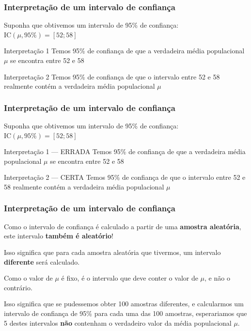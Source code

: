 \documentclass[11pt]{beamer}
\begin{document}
\begin{frame}
\frametitle{Interpretação de um intervalo de confiança}

Suponha que obtivemos um intervalo de 95\% de confiança:
\(\text{IC}(\mu,95\%) = [52; 58]\)

\begin{block}{Interpretação 1}
Temos 95\% de confiança de que a verdadeira média populacional $\mu$
se encontra entre 52 e 58
\end{block}
\begin{block}{Interpretação 2}
Temos 95\% de confiança de que o intervalo entre 52 e 58 realmente
contém a verdadeira média populacional $\mu$
\end{block}
\end{frame}

\begin{frame}
\frametitle{Interpretação de um intervalo de confiança}

Suponha que obtivemos um intervalo de 95\% de confiança:
\(\text{IC}(\mu,95\%) = [52; 58]\)

\begin{alertblock}{Interpretação 1 --- ERRADA}
Temos 95\% de confiança de que a verdadeira média populacional $\mu$
se encontra entre 52 e 58
\end{alertblock}
\begin{block}{Interpretação 2 --- CERTA}
Temos 95\% de confiança de que o intervalo entre 52 e 58 realmente
contém a verdadeira média populacional $\mu$
\end{block}
\end{frame}

\begin{frame}
\frametitle{Interpretação de um intervalo de confiança}

Como o intervalo de confiança é calculado a partir de uma
\textbf{amostra aleatória}, este intervalo \textbf{também é aleatório}!

Isso significa que para cada amostra aleatória que tivermos, um
intervalo \textbf{diferente} será calculado.

Como o valor de \(\mu\) é fixo, é o intervalo que deve conter o valor de
\(\mu\), e não o contrário.

Isso significa que se pudessemos obter 100 amostras diferentes, e
calcularmos um intervalo de confiança de 95\% para cada uma das 100
amostras, esperariamos que 5 destes intervalos \textbf{não} contenham o
verdadeiro valor da média populacional \(\mu\).
\end{frame}
\end{document}
